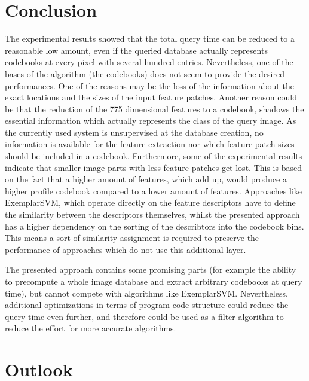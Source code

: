 \chapter{Conclusion}

The experimental results showed that the total query time can be reduced to a reasonable low amount, even if the queried database actually represents codebooks at every pixel with several hundred entries. Nevertheless, one of the bases of the algorithm (the codebooks) does not seem to provide the desired performances. One of the reasons may be the loss of the information about the exact locations and the sizes of the input feature patches. Another reason could be that the reduction of the 775 dimensional features to a codebook, shadows the essential information which actually represents the class of the query image. As the currently used system is unsupervised at the database creation, no information is available for the feature extraction nor which feature patch sizes should be included in a codebook. Furthermore, some of the experimental results indicate that smaller image parts with less feature patches get lost. This is based on the fact that a higher amount of features, which add up, would produce a higher profile codebook compared to a lower amount of features. Approaches like ExemplarSVM, which operate directly on the feature descriptors have to define the similarity between the descriptors themselves, whilst the presented approach has a higher dependency on the sorting of the describtors into the codebook bins. This means a sort of similarity assignment is required to preserve the performance of approaches which do not use this additional layer.

The presented approach contains some promising parts (for example the ability to precompute a whole image database and extract arbitrary codebooks at query time), but cannot compete with algorithms like ExemplarSVM. Nevertheless, additional optimizations in terms of program code structure could reduce the query time even further, and therefore could be used as a filter algorithm to reduce the effort for more accurate algorithms.

\chapter{Outlook}

